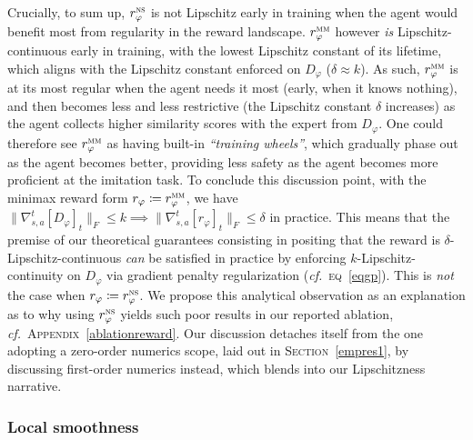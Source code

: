 Crucially, to sum up, $r_\varphi^\textsc{ns}$ is not Lipschitz early in training when the agent would benefit most
from regularity in the reward landscape. $r_\varphi^\textsc{mm}$ however \emph{is} Lipschitz-continuous
early in training, with the lowest Lipschitz constant of its lifetime, which aligns with the Lipschitz constant
enforced on $D_\varphi$ ($\delta \approx k$).
As such, $r_\varphi^\textsc{mm}$ is at its most regular when the agent needs it most (early, when it knows nothing),
and then becomes less and less restrictive (the Lipschitz constant $\delta$ increases) as the
agent collects higher similarity scores with the expert from $D_\varphi$.
One could therefore see $r_\varphi^\textsc{mm}$ as having built-in \textit{``training wheels''},
which gradually phase out as the agent becomes better, providing less safety as the agent becomes more
proficient at the imitation task.
To conclude this discussion point, with the minimax reward form $r_\varphi \coloneqq r_\varphi^\textsc{mm}$,
we have $\lVert \nabla_{s,a}^t[D_\varphi]_t \rVert _F \leq k
\implies \lVert \nabla_{s,a}^t[r_\varphi]_t \rVert _F \leq \delta$ in practice.
This means that the premise of our theoretical guarantees consisting in positing that
the reward is $\delta$-Lipschitz-continuous \emph{can} be satisfied in practice by enforcing
$k$-Lipschitz-continuity on $D_\varphi$ via gradient penalty regularization (\textit{cf.}~\textsc{eq}~\ref{eqgp}).
This is \emph{not} the case when $r_\varphi \coloneqq r_\varphi^\textsc{ns}$.
We propose this analytical observation as an explanation as to why using $r_\varphi^\textsc{ns}$
yields such poor results in our reported ablation, \textit{cf.}~\textsc{Appendix}~\ref{ablationreward}.
Our discussion detaches itself from the one adopting a zero-order numerics scope, laid out in
\textsc{Section}~\ref{empres1}, by discussing first-order numerics instead, which blends into our Lipschitzness
narrative.

\subsubsection{Local smoothness}

